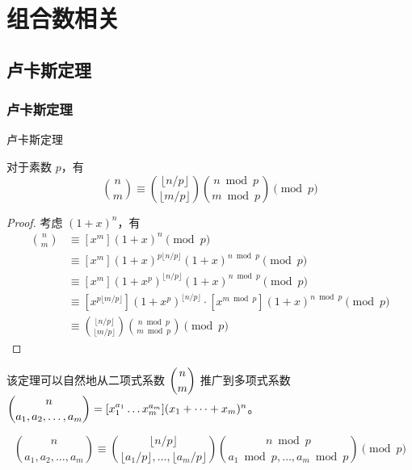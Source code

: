 \documentclass[../main.tex]{subfiles}
\begin{document}
\section{组合数相关}

\subsection{卢卡斯定理}

\subsubsection{卢卡斯定理}

\begin{frame}{卢卡斯定理}
\begin{theo}[卢卡斯定理]
对于素数 $p$，有
$$
\binom{n}{m}\equiv\binom{\lfloor n/p\rfloor}{\lfloor m/p\rfloor}\binom{n\bmod p}{m\bmod p}\pmod p
$$
\end{theo}
\end{frame}

\begin{frame}
\begin{proof}
考虑 $(1+x)^n$，有
$$
\begin{aligned}
\binom{n}{m}&\equiv [x^m](1+x)^n \pmod p\\
&\equiv [x^m](1+x)^{p\lfloor n/p\rfloor}(1+x)^{n\bmod p}\pmod p\\
&\equiv [x^m](1+x^p)^{\lfloor n/p\rfloor}(1+x)^{n\bmod p}\pmod p\\
&\equiv[x^{p\lfloor m/p\rfloor}](1+x^p)^{\lfloor n/p\rfloor}\cdot[x^{m\bmod p}](1+x)^{n\bmod p}\pmod p\\
&\equiv \binom{\lfloor n/p\rfloor}{\lfloor m/p\rfloor}\binom{n\bmod p}{m\bmod p}\pmod p
\end{aligned}
$$
\end{proof}
\end{frame}

\begin{frame}
该定理可以自然地从二项式系数 $\dbinom{n}{m}$ 推广到多项式系数 $\dbinom{n}{a_1,a_2,\dots,a_m}=[x_1^{a_1}\dots x_m^{a_m}](x_1+\dots+x_m)^n$。\pause

\begin{coro}
$$
\binom{n}{a_1,a_2,\dots,a_m}\equiv \binom{\lfloor n/p\rfloor}{\lfloor a_1/p\rfloor,\dots,\lfloor a_m/p\rfloor}\binom{n\bmod p}{a_1\bmod p,\dots,a_m\bmod p}\pmod p
$$
\end{coro}
\end{frame}

\subsubsection{}
\end{document}
